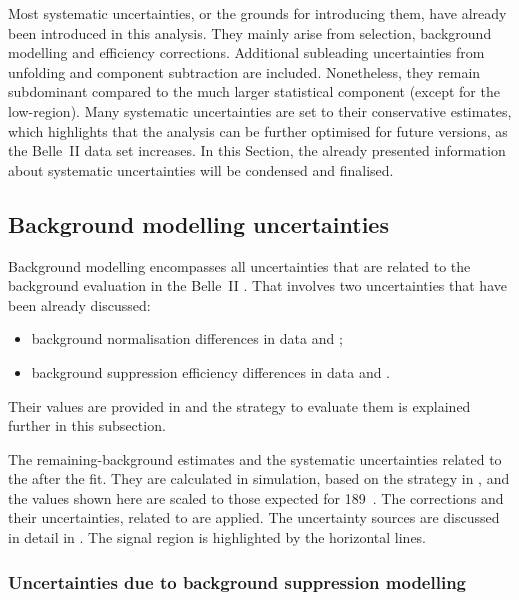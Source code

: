 Most systematic uncertainties, or the grounds for introducing them, have already been introduced in this analysis.
They mainly arise from selection, background modelling and efficiency corrections.
Additional subleading uncertainties from unfolding and \BtoXdgamma component subtraction are included.
Nonetheless, they remain subdominant compared to the much larger statistical component (except for the low-\EB region).
Many systematic uncertainties are set to their conservative estimates, 
which highlights that the analysis can be further optimised for future versions, as the Belle~II data set increases.
In this Section, the already presented information about systematic uncertainties will be condensed and finalised.

\subsection{Background modelling uncertainties}\label{sec:background_uncertainties}

Background modelling encompasses all uncertainties that are related to the background evaluation in the Belle~II \MC.
That involves two uncertainties that have been already discussed:
\begin{itemize}
    \item background normalisation differences in data and \MC;
    \item background suppression efficiency differences in data and \MC.
\end{itemize}
Their values are provided in  and the strategy to evaluate them is explained further in this subsection.

\begin{table}[htbp!]
    \centering
    \caption{\label{tab:background_uncertainties} 
    The remaining-\BB background estimates and the systematic uncertainties related to the after the \Mbc fit.
    They are calculated in simulation, based on the strategy in , 
    and the values shown here are scaled to those expected for 189~\invfb.
    The corrections and their uncertainties, related to  are applied.
    The uncertainty sources are discussed in detail in .
    The signal region is highlighted by the horizontal lines.
    }
    
\end{table}

\subsubsection{Uncertainties due to background suppression modelling}\label{sec:correction_systematic}

